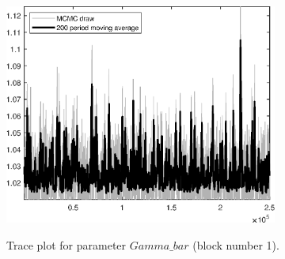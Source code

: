 \begin{figure}[H]
\centering
  \includegraphics[width=0.8\textwidth]{directed_search_est_alt_obs/graphs/TracePlot_Gamma_bar_blck_1}\\
    \caption{Trace plot for parameter $Gamma\_bar$ (block number 1).}
\end{figure}
